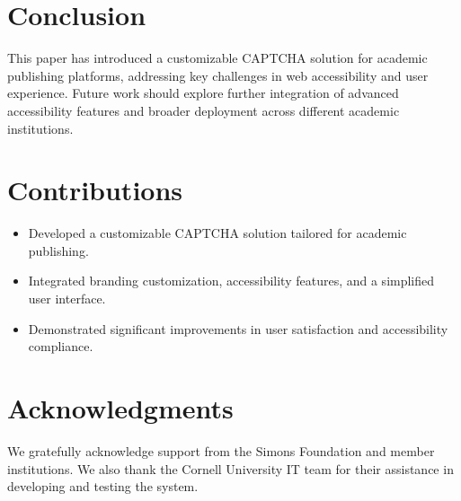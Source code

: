 \documentclass{article}
\begin{document}
\section{Conclusion}
This paper has introduced a customizable CAPTCHA solution for academic publishing platforms, addressing key challenges in web accessibility and user experience. Future work should explore further integration of advanced accessibility features and broader deployment across different academic institutions.

\section{Contributions}
\begin{itemize}
    \item Developed a customizable CAPTCHA solution tailored for academic publishing.
    \item Integrated branding customization, accessibility features, and a simplified user interface.
    \item Demonstrated significant improvements in user satisfaction and accessibility compliance.
\end{itemize}

\section*{Acknowledgments}
We gratefully acknowledge support from the Simons Foundation and member institutions. We also thank the Cornell University IT team for their assistance in developing and testing the system.



\end{document}

